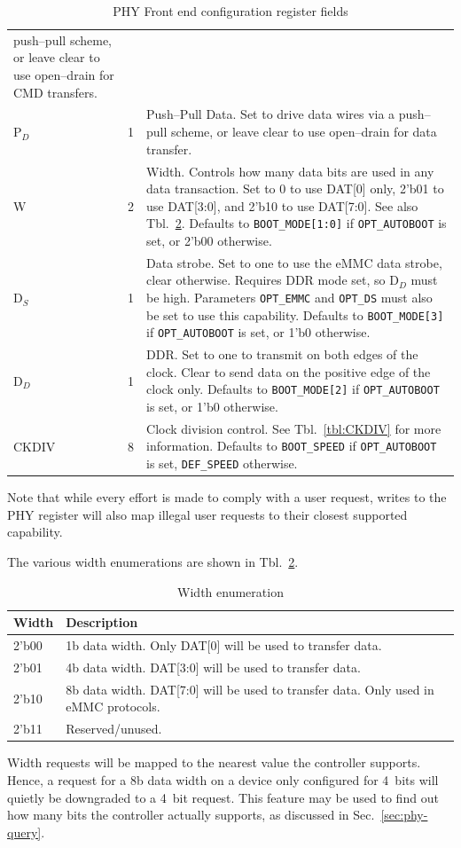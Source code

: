 \documentclass{gqtekspec}
\begin{document}
\begin{table}
\begin{center}
\begin{tabular}{|p{1.2in}|p{0.5in}|p{3.5in}|}
	push--pull scheme, or leave clear to use open--drain for CMD transfers.
	\\
P$_D$ & 1 & Push--Pull Data.  Set to drive data wires via a push--pull
	scheme, or leave clear to use open--drain for data transfer.
	\\
%
%
W & 2 & Width.  Controls how many data bits are used in any data transaction.
	Set to 0 to use DAT[0] only, 2'b01 to use DAT[3:0], and 2'b10 to use
	DAT[7:0].  See also Tbl.~\ref{tbl:PHY-WIDTH}.  Defaults to
	{\tt BOOT\_MODE[1:0]} if {\tt OPT\_AUTOBOOT} is set, or
	2'b00 otherwise.\\
D$_S$&1& Data strobe.  Set to one to use the eMMC data strobe, clear
	otherwise.  Requires DDR mode set, so D$_D$ must be high.  Parameters
	{\tt OPT\_EMMC} and {\tt OPT\_DS} must also be set to use this
	capability.  Defaults to {\tt BOOT\_MODE[3]} if {\tt OPT\_AUTOBOOT}
	is set, or 1'b0 otherwise.\\
D$_D$ & 1 & DDR.  Set to one to transmit on both edges of the clock.  Clear
	to send data on the positive edge of the clock only.  Defaults to
	{\tt BOOT\_MODE[2]} if {\tt OPT\_AUTOBOOT} is set, or 1'b0 otherwise.\\
CKDIV & 8 & Clock division control.  See Tbl.~\ref{tbl:CKDIV} for more
	information.
	Defaults to {\tt BOOT\_SPEED} if {\tt OPT\_AUTOBOOT} is set,
	{\tt DEF\_SPEED} otherwise.
	\\\hline
\end{tabular}
\caption{PHY Front end configuration register fields}\label{tbl:PHY}
\end{center}\end{table}
Note that while every effort is made to comply with a user request, writes to
the PHY register will also map illegal user requests to their closest supported
capability.

The various width enumerations are shown in Tbl.~\ref{tbl:PHY-WIDTH}.
\begin{table}\begin{center}
\begin{tabular}{|p{1.2in}|p{4.0in}|}\hline
	\rowcolor[gray]{0.85} Width & Description\\\hline\hline
2'b00 & 1b data width.  Only DAT[0] will be used to transfer data.\\
2'b01 & 4b data width.  DAT[3:0] will be used to transfer data.\\
2'b10 & 8b data width.  DAT[7:0] will be used to transfer data.  Only used in
	eMMC protocols.\\
2'b11 & Reserved/unused.  \\\hline
\end{tabular}
\caption{Width enumeration}\label{tbl:PHY-WIDTH}
\end{center}\end{table}
Width requests will be mapped to the nearest value the controller supports.
Hence, a request for a 8b data width on a device only configured for 4~bits
will quietly be downgraded to a 4~bit request.  This feature may be used to
find out how many bits the controller actually supports, as discussed in
Sec.~\ref{sec:phy-query}.
\end{document}
